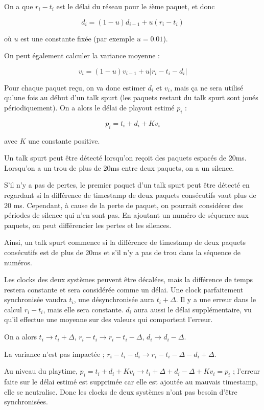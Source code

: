 			On a que $r_i - t_i$ est le délai du réseau pour le $i$ème paquet, et donc 
			
			$$d_i = (1 - u) d_{i - 1} + u(r_i - t_i)$$
			
			où $u$ est une constante fixée (par exemple $u = 0.01$).
			
			On peut également calculer la variance moyenne :
			
			$$v_i = (1 - u) v_{i - 1} + u \vert r_i - t_i - d_i\vert$$
			
			Pour chaque paquet reçu, on va donc estimer $d_i$ et $v_i$, mais ça ne sera utilisé qu'une fois au début d'un talk spurt (les paquets restant du talk spurt sont joués périodiquement). On a alors le délai de playout estimé $p_i$ :
			
			$$p_i = t_i + d_i + K v_i$$
		
			avec $K$ une constante positive.
		
			Un talk spurt peut être détecté lorsqu'on reçoit des paquets espacés de 20ms. Lorsqu'on a un trou de plus de 20ms entre deux paquets, on a un silence. 
			
			S'il n'y a pas de pertes, le premier paquet d'un talk spurt peut être détecté en regardant si la différence de timestamp de deux paquets consécutifs vaut plus de 20 ms.	Cependant, à cause de la perte de paquet, on pourrait considérer des périodes de silence qui n'en sont pas. En ajoutant un numéro de séquence aux paquets, on peut différencier les pertes et les silences.
			
			Ainsi, un talk spurt commence si la différence de timestamp de deux paquets consécutifs est de plus de 20ms et s'il n'y a pas de trou dans la séquence de numéros.
		
			Les clocks des deux systèmes peuvent être décalées, mais la différence de temps restera constante et sera considérée comme un délai. Une clock parfaitement synchronisée vaudra $t_i$, une désynchronisée aura $t_i + \Delta$. Il y a une erreur dans le calcul $r_i - t_i$, mais elle sera constante. $d_i$ aura aussi le délai supplémentaire, vu qu'il effectue une moyenne sur des valeurs qui comportent l'erreur.
		
			On a alors $t_i \rightarrow t_i + \Delta$, $r_i - t_i \rightarrow r_i - t_i - \Delta$, $d_i \rightarrow d_i - \Delta$.
		
			La variance n'est pas impactée ; $r_i - t_i - d_i \rightarrow r_i - t_i - \Delta - d_i + \Delta$.
		
			Au niveau du playtime, $p_i = t_i + d_i + K v_i \rightarrow t_i + \Delta + d_i - \Delta + K v_i = p_i$ ; l'erreur faite sur le délai estimé est supprimée car elle est ajoutée au mauvais timestamp, elle se neutralise. Donc les clocks de deux systèmes n'ont pas besoin d'être synchronisées.
	
